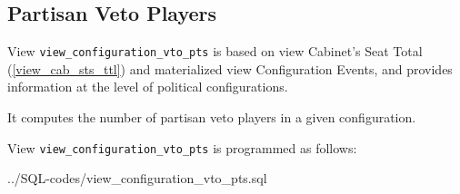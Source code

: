 \subsection{Partisan Veto Players}\label{view_configuration_vto_pts}
View \texttt{\footnotesize view\_configuration\_vto\_pts} is based on view Cabinet's Seat Total (\ref{view_cab_sts_ttl}) and materialized view Configuration Events, and provides information at the level of political configurations.

It computes the number of partisan veto players in a given configuration.

View \texttt{\footnotesize view\_configuration\_vto\_pts} is programmed as follows:

%
{../SQL-codes/view_configuration_vto_pts.sql}

